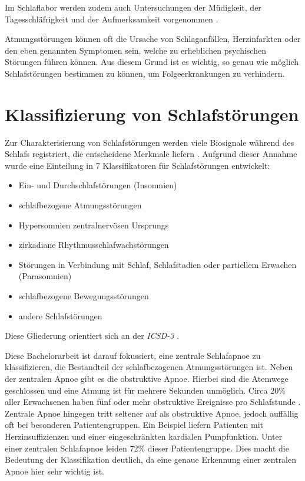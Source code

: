 Im Schlaflabor werden zudem auch Untersuchungen der Müdigkeit, der Tagesschläfrigkeit und der Aufmerksamkeit vorgenommen \cite{croenleinSchlafmedizin1x1Praxisorientiertes2017}.

Atmungsstörungen können oft die Ursache von Schlaganfällen, Herzinfarkten oder den eben genannten Symptomen sein, welche zu erheblichen psychischen Störungen führen können.
Aus diesem Grund ist es wichtig, so genau wie möglich Schlafstörungen bestimmen zu können, um Folgeerkrankungen zu verhindern. 

\section{Klassifizierung von Schlafstörungen}
\label{ch:Basics:se:classification}
Zur Charakterisierung von Schlafstörungen werden viele Biosignale während des Schlafs registriert, die entscheidene Merkmale liefern \cite{stuckPraxisSchlafmedizinDiagnostik2018}.
Aufgrund dieser Annahme wurde eine Einteilung in 7 Klassifikatoren für Schlafstörungen entwickelt:
\begin{itemize}
    \item Ein- und Durchschlafstörungen (Insomnien)
    \item schlafbezogene Atmungsstörungen
    \item Hypersomnien zentralnervösen Ursprungs
    \item zirkadiane Rhythmusschlafwachstörungen
    \item Störungen in Verbindung mit Schlaf, Schlafstadien oder partiellem Erwachen (Parasomnien)
    \item schlafbezogene Bewegungsstörungen
    \item andere Schlafstörungen
\end{itemize}

Diese Gliederung orientiert sich an der \textit{ICSD-3} \cite{stuckPraxisSchlafmedizinDiagnostik2018}.


Diese Bachelorarbeit ist darauf fokussiert, eine zentrale Schlafapnoe zu klassifizieren, die Bestandteil der {\glqq schlafbezogenen Atmungsstörungen\grqq} ist.
Neben der zentralen Apnoe gibt es die obstruktive Apnoe. 
Hierbei sind die Atemwege geschlossen und eine Atmung ist für mehrere Sekunden unmöglich.
Circa 20\% aller Erwachsenen haben fünf oder mehr obstruktive Ereignisse pro Schlafstunde \cite{croenleinSchlafmedizin1x1Praxisorientiertes2017}.
Zentrale Apnoe hingegen tritt seltener auf als obstruktive Apnoe, jedoch auffällig oft bei besonderen Patientengruppen. 
Ein Beispiel liefern Patienten mit Herzinsuffizienzen und einer eingeschränkten kardialen Pumpfunktion.
Unter einer zentralen Schlafapnoe leiden 72\% dieser Patientengruppe. 
Dies macht die Bedeutung der Klassifikation deutlich, da eine genaue Erkennung einer zentralen Apnoe hier sehr wichtig ist.

